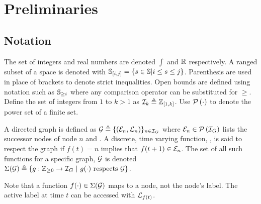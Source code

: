 \section{Preliminaries}
\subsection{Notation}
The set of integers and real numbers are denoted $\int$ and $\mathbb{R}$ respectively. A ranged subset of a space is denoted with $\mathbb{S}_{[i,j]}=\{s\in\mathbb{S}|i\leq s\leq j\}$. Parenthesis are used in place of brackets to denote strict inequalities. Open bounds are defined using notation such as $\mathbb{S}_{\geq i}$ where any comparison operator can be substituted for $\geq$. Define the set of integers from $1$ to $k>1$ as $\mathcal{I}_{k}\triangleq\mathbb{Z}_{[1,k]}$. Use $\mathcal{P}\left(\cdot\right)$ to denote the power set of a finite set.

A directed graph  is defined as $\graph\triangleq\{(\gnodeedges{n},\gnodelabel{n})\}_{n\in\idxset{\gnumnodes}}$ where $\gnodeedges{n}\in\PowerSet{\idxset{\gnumnodes}}$ lists the successor nodes of node $n$ and . A discrete, time varying function, , is said to respect the graph if $f(t)=n$ implies that $f(t+1)\in\gnodeedges{n}$. The set of all such functions for a specific graph, $\mathcal{G}$ is denoted $\Sigma(\mathcal{G})\triangleq\{g:\int\rgeq{0}\rightarrow\idxset{\gnumnodes}\ |\ g(\cdot)\text{ respects }\graph\}$. 
\begin{remark}
Note that a function $f(\cdot)\in\Sigma(\mathcal{G})$ maps to a node, not the node's label. The active label at time $t$ can be accessed with $\mathcal{L}_{f(t)}$. 
\end{remark}

